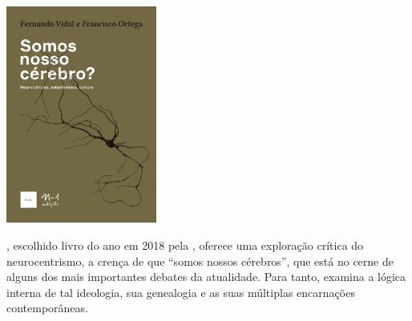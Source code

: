 \pagebreak

\hspace{.5cm}

\begin{center}
\hspace*{-.5cm}\includegraphics[width=49.5mm]{./imgs/cerebro.jpeg}
\end{center}

\hspace*{-7cm}\hrulefill\hspace*{-7cm}

\medskip

, escolhido livro do ano em 2018 pela {}, oferece uma exploração crítica do neurocentrismo, a crença de que “somos nossos cérebros”, que está no cerne de alguns dos mais importantes debates da atualidade. Para tanto, examina a lógica interna de tal ideologia, sua genealogia e as suas múltiplas encarnações contemporâneas.

\vfill

\hspace*{-.4cm}\begin{minipage}[c]{1\linewidth}
\small{
{}}
\end{minipage}

\pagebreak

